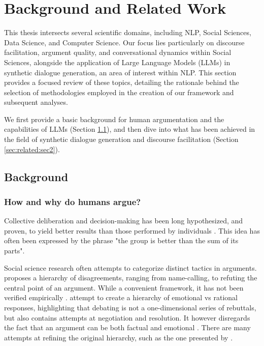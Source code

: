%
\chapter{Background and Related Work}
\label{sec:related}

This thesis intersects several scientific domains, including \ac{NLP}, Social Sciences, Data Science, and Computer Science. Our focus lies particularly on discourse facilitation, argument quality, and conversational dynamics within Social Sciences, alongside the application of Large Language Models (LLMs) in synthetic dialogue generation, an area of interest within \ac{NLP}. This section provides a focused review of these topics, detailing the rationale behind the selection of methodologies employed in the creation of our framework and subsequent analyses. 

We first provide a basic background for human argumentation and the capabilities of LLMs (Section \ref{sec:related:sec1}), and then dive into what has been achieved in the field of synthetic dialogue generation and discourse facilitation (Section \ref{sec:related:sec2}).


\section{Background}
\label{sec:related:sec1}

\subsection{How and why do humans argue?}
\label{sec:background:arguments-how}

Collective deliberation and decision-making has been long hypothesized, and proven, to yield better results than those performed by individuals \cite{david-collaborative, stefan-dissent}. This idea has often been expressed by the phrase "the group is better than the sum of its parts". 

Social science research often attempts to categorize distinct tactics in arguments. \citet{graham2008disagree} proposes a hierarchy of disagreements, ranging from name-calling, to refuting the central point of an argument.  While a convenient framework, it has not been verified empirically \cite{dekock2022disagree}. \citet{walker-etal-2012-corpus} attempt to create a hierarchy of emotional vs rational responses, highlighting that debating is not a one-dimensional series of rebuttals, but also contains attempts at negotiation and resolution. It however disregards the fact that an argument can be both factual and emotional \cite{dekock2022disagree}. There are many attempts at refining the original hierarchy, such as the one presented by \citet{benesch2016counterspeech}.

